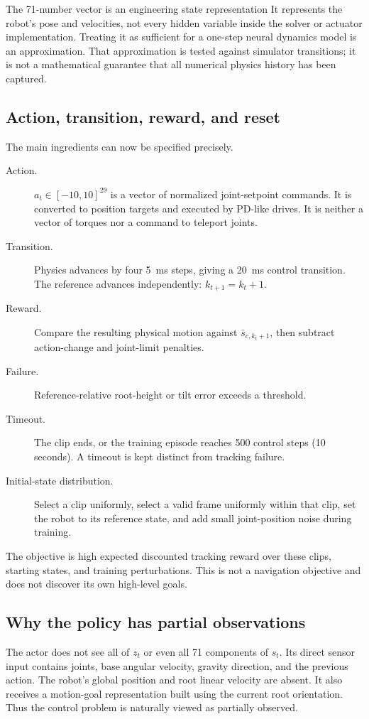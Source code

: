 \documentclass[11pt,a4paper]{article}
\begin{document}
\begin{caution}{The 71-number vector is an engineering state representation}
It represents the robot's pose and velocities, not every hidden variable inside
the solver or actuator implementation. Treating it as sufficient for a one-step
neural dynamics model is an approximation. That approximation is tested against
simulator transitions; it is not a mathematical guarantee that all numerical
physics history has been captured.
\end{caution}

\subsection{Action, transition, reward, and reset}
The main ingredients can now be specified precisely.
\begin{description}
\item[Action.] $a_t\in[-10,10]^{29}$ is a vector of normalized joint-setpoint
commands. It is converted to position targets and executed by PD-like drives.
It is neither a vector of torques nor a command to teleport joints.
\item[Transition.] Physics advances by four 5~ms steps, giving a 20~ms control
transition. The reference advances independently: $k_{t+1}=k_t+1$.
\item[Reward.] Compare the resulting physical motion against
$\bar s_{c,k_t+1}$, then subtract action-change and joint-limit penalties.
\item[Failure.] Reference-relative root-height or tilt error exceeds a threshold.
\item[Timeout.] The clip ends, or the training episode reaches 500 control steps
(10 seconds). A timeout is kept distinct from tracking failure.
\item[Initial-state distribution.] Select a clip uniformly, select a valid frame
uniformly within that clip, set the robot to its reference state, and add small
joint-position noise during training.
\end{description}
The objective is high expected discounted tracking reward over these clips,
starting states, and training perturbations. This is not a navigation objective
and does not discover its own high-level goals.

\subsection{Why the policy has partial observations}
The actor does not see all of $z_t$ or even all 71 components of $s_t$. Its direct
sensor input contains joints, base angular velocity, gravity direction, and the
previous action. The robot's global position and root linear velocity are absent.
It also receives a motion-goal representation built using the current root
orientation. Thus the control problem is naturally viewed as partially observed.
\end{document}
